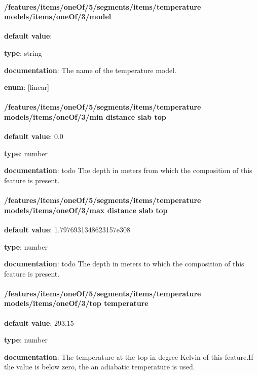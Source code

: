 \paragraph{/features/items/oneOf/5/segments/items/temperature models/items/oneOf/3/model} \begin{itemized}
\item {\bf default value}: 
\item {\bf type}: string
\item {\bf documentation}: The name of the temperature model.
\item {\bf enum}: [linear]\end{itemized}\paragraph{/features/items/oneOf/5/segments/items/temperature models/items/oneOf/3/min distance slab top} \begin{itemized}
\item {\bf default value}: 0.0
\item {\bf type}: number
\item {\bf documentation}: todo The depth in meters from which the composition of this feature is present.
\end{itemized}\paragraph{/features/items/oneOf/5/segments/items/temperature models/items/oneOf/3/max distance slab top} \begin{itemized}
\item {\bf default value}: 1.7976931348623157e308
\item {\bf type}: number
\item {\bf documentation}: todo The depth in meters to which the composition of this feature is present.
\end{itemized}\paragraph{/features/items/oneOf/5/segments/items/temperature models/items/oneOf/3/top temperature} \begin{itemized}
\item {\bf default value}: 293.15
\item {\bf type}: number
\item {\bf documentation}: The temperature at the top in degree Kelvin of this feature.If the value is below zero, the an adiabatic temperature is used.

\end{itemized}
